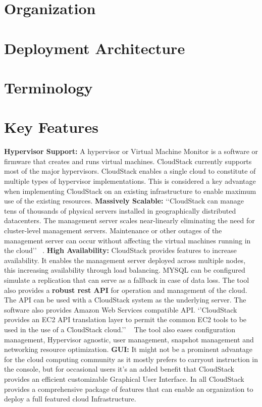 \section{Organization}

\section{Deployment Architecture}

\section{Terminology}

\section{Key Features}
{\bf Hypervisor Support: } A hypervisor or Virtual Machine Monitor is a software or firmware that creates 
and runs virtual machines. CloudStack currently supports most of the major hypervisors.  CloudStack enables 
a single cloud to constitute of multiple types of hypervisor implementations. This is considered a key 
advantage when implementing CloudStack on an existing infrastructure to enable maximum use of the existing 
resources. {\bf Massively Scalable:} ‘‘CloudStack can manage tens of thousands of physical servers installed
in geographically distributed datacenters. The management server scales near-linearly eliminating the need for
cluster-level management servers. Maintenance or other outages of the management server can occur without
affecting the virtual machines running in the cloud’’ ~\cite{hid-sp18-417-www-cloudstack-scalability}. 
{\bf High Availability:} CloudStack provides features to increase availability. It enables the management server 
deployed across multiple nodes, this increasing availability through load balancing. MYSQL can be configured
simulate a replication that can serve as a fallback in case of data loss. The tool also provides a {\bf robust rest API} 
for operation and management of the cloud. The API can be used with a CloudStack system as the underlying server. 
The software also provides Amazon Web Services compatible API. ‘’CloudStack provides an EC2 API translation layer
to permit the common EC2 tools to be used in the use of a CloudStack cloud.’’ ~\cite{hid-sp18-417-www-cloudstack-aws}
The tool also eases configuration management, Hypervisor agnostic, user management, snapshot management and 
networking resource optimization. 
{\bf GUI: } It might not be a prominent advantage for the cloud computing community as it mostly prefers to carryout 
instruction in the console, but for occasional users it’s an added benefit that CloudStack provides an efficient 
customizable Graphical User Interface. In all CloudStack provides a comprehensive package of features that can enable 
an organization to deploy a full featured cloud Infrastructure.


